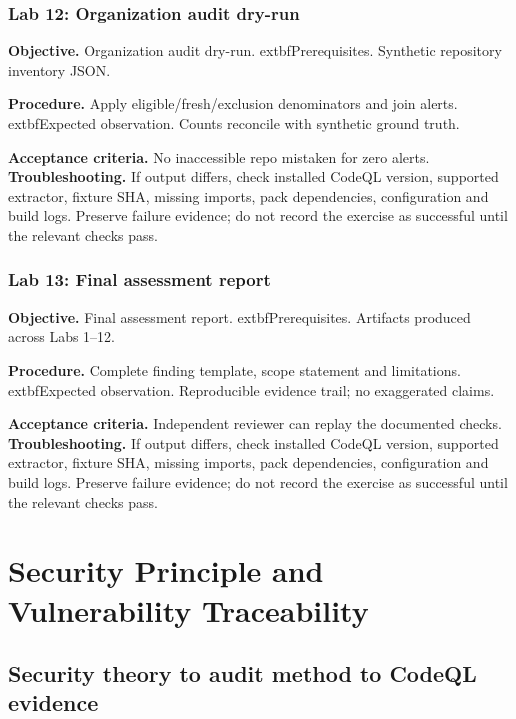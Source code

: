 \documentclass[11pt,letterpaper,oneside]{book}
\begin{document}
\subsection{Lab 12: Organization audit dry-run}

\textbf{Objective.} Organization audit dry-run. 	extbf{Prerequisites.} Synthetic repository inventory JSON.

\textbf{Procedure.} Apply eligible/fresh/exclusion denominators and join alerts. 	extbf{Expected observation.} Counts reconcile with synthetic ground truth.

\textbf{Acceptance criteria.} No inaccessible repo mistaken for zero alerts. \textbf{Troubleshooting.} If output differs, check installed CodeQL version, supported extractor, fixture SHA, missing imports, pack dependencies, configuration and build logs. Preserve failure evidence; do not record the exercise as successful until the relevant checks pass.

\subsection{Lab 13: Final assessment report}

\textbf{Objective.} Final assessment report. 	extbf{Prerequisites.} Artifacts produced across Labs 1--12.

\textbf{Procedure.} Complete finding template, scope statement and limitations. 	extbf{Expected observation.} Reproducible evidence trail; no exaggerated claims.

\textbf{Acceptance criteria.} Independent reviewer can replay the documented checks. \textbf{Troubleshooting.} If output differs, check installed CodeQL version, supported extractor, fixture SHA, missing imports, pack dependencies, configuration and build logs. Preserve failure evidence; do not record the exercise as successful until the relevant checks pass.

\chapter{Security Principle and Vulnerability Traceability}

\section{Security theory to audit method to CodeQL evidence}
\end{document}
